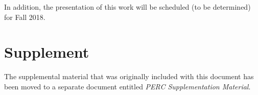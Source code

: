 \documentclass[letterpaper,twocolumn,10pt]{article}
\begin{document}
In addition, the presentation of this work will be scheduled (to be determined) for Fall 2018.

\section{Supplement}

The supplemental material that was originally included with this document has been moved to a separate
document entitled \textit{PERC Supplementation Material}.


\newpage
\balance

{\footnotesize 
}


\end{document}

